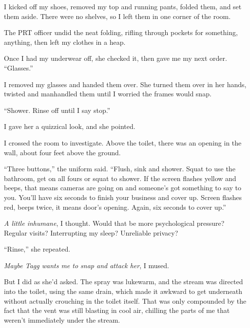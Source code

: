 I kicked off my shoes, removed my top and running pants, folded them, and set them aside.  There were no shelves, so I left them in one corner of the room.



The PRT officer undid the neat folding, rifling through pockets for something, anything, then left my clothes in a heap.



Once I had my underwear off, she checked it, then gave me my next order.  ``Glasses.''



I removed my glasses and handed them over.  She turned them over in her hands, twisted and manhandled them until I worried the frames would snap.



``Shower.  Rinse off until I say stop.''



I gave her a quizzical look, and she pointed.



I crossed the room to investigate.  Above the toilet, there was an opening in the wall, about four feet above the ground.



``Three buttons,'' the uniform said.  ``Flush, sink and shower.  Squat to use the bathroom, get on all fours or squat to shower.  If the screen flashes yellow and beeps, that means cameras are going on and someone's got something to say to you.  You'll have six seconds to finish your business and cover up.  Screen flashes red, beeps twice, it means door's opening.  Again, six seconds to cover up.''



\emph{A little inhumane}, I thought.  Would that be more psychological pressure?  Regular visits?  Interrupting my sleep?  Unreliable privacy?



``Rinse,'' she repeated.



\emph{Maybe Tagg wants me to snap and attack her}, I mused.



But I did as she'd asked.  The spray was lukewarm, and the stream was directed into the toilet, using the same drain, which made it awkward to get underneath without actually crouching in the toilet itself.  That was only compounded by the fact that the vent was still blasting in cool air, chilling the parts of me that weren't immediately under the stream.



